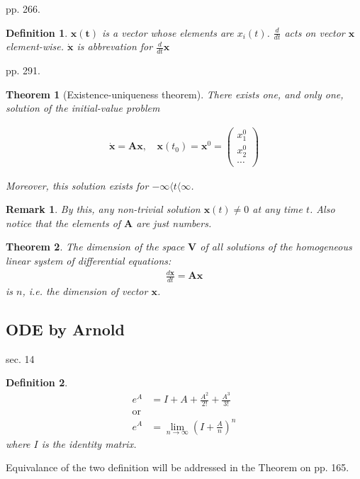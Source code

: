 \documentclass{article}
\numberwithin{equation}{subsection} %
\newtheorem{defi}{Definition}[section]
\newtheorem{thm}{Theorem}[section]
\newtheorem{remark}{Remark}[section]
\theoremstyle{definition}
\begin{document}
    pp. 266.

    \begin{defi}
        $\mathbf{x(t)}$ is a vector whose elements are $x_i(t)$.
        $ \frac{d}{d t}$ acts on vector $\mathbf{x}$ element-wise.
        $\dot{\mathbf{x}}$ is abbrevation for $\frac{d}{d t}\mathbf{x}$
    \end{defi}
    
    pp. 291.

    \begin{thm}[Existence-uniqueness theorem]
        There exists one, and only one, solution of the initial-value
        problem

        \begin{align}
            \dot{\mathbf{x}}=\mathbf{A}\mathbf{x}\text{, }&
                \mathbf{x}(t_0) = \mathbf{x}^0 = 
                \left(
                \begin{array}{c}
		            x^0_1\\
                    x^0_2\\
                    \cdots
                \end{array} 
                    \right)
        \end{align}
        
        Moreover, this solution exists for $-\infty\langle t\langle \infty$.
    \end{thm}
    \begin{remark}
        By this, any non-trivial solution $\mathbf{x}(t)\neq 0$ at any
        time $t$. Also notice that the elements of $\mathbf{A}$ are just
        numbers.
    \end{remark}
    
    \begin{thm}
        The dimension of the space $\mathbf{V}$ of all solutions of the
        homogeneous linear system of differential equations:
        \begin{align}
            \frac{d\mathbf{x}}{dt}=\mathbf{Ax}
        \end{align}
        is $n$, i.e. the dimension of vector $\mathbf{x}$.
    \end{thm} 
    \subsection{ODE by Arnold}
    sec. 14
    \begin{defi}
        \begin{align}
            \label{eq:e^A}
            e^A &= I + A + \frac{A^2}{2!} + \frac{A^3}{3!}\\
            \text{or}& \nonumber \\
            e^A &= \lim_{n\to \infty}(I+\frac{A}{n})^n
        \end{align}
        where $I$ is the identity matrix.
    \end{defi}
    Equivalance of the two definition will be addressed in the Theorem on
    pp. 165.
\end{document}
